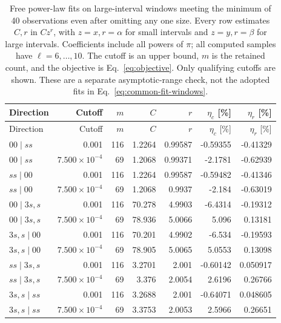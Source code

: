 \begin{longtable}{lrrrrrr}
\caption{Free power-law fits on large-interval windows meeting the minimum of 40 observations even after omitting any one size. Every row estimates $C,r$ in $Cz^r$, with $z=x,r=\alpha$ for small intervals and $z=y,r=\beta$ for large intervals. Coefficients include all powers of $\pi$; all computed samples have $\ell=6,\ldots,10$. The cutoff is an upper bound, $m$ is the retained count, and the objective is Eq.~\eqref{eq:objective}. Only qualifying cutoffs are shown. These are a separate asymptotic-range check, not the adopted fits in Eq.~\eqref{eq:common-fit-windows}.}
\label{tab:boson-large-windows}\\\toprule
Direction & Cutoff & $m$ & $C$ & $r$ & $\eta_c$ [\%] & $\eta_r$ [\%]\\\midrule
\endfirsthead
\toprule
Direction & Cutoff & $m$ & $C$ & $r$ & $\eta_c$ [\%] & $\eta_r$ [\%]\\\midrule
\endhead
\bottomrule\endfoot
$00\mid ss$ & 0.001 & 116 & 1.2264 & 0.99587 & -0.59355 & -0.41329\\
$00\mid ss$ & $7.500\!\times\!10^{-4}$ & 69 & 1.2068 & 0.99371 & -2.1781 & -0.62939\\
$ss\mid 00$ & 0.001 & 116 & 1.2264 & 0.99587 & -0.59482 & -0.41346\\
$ss\mid 00$ & $7.500\!\times\!10^{-4}$ & 69 & 1.2068 & 0.9937 & -2.184 & -0.63019\\
$00\mid 3s,s$ & 0.001 & 116 & 70.278 & 4.9903 & -6.4314 & -0.19312\\
$00\mid 3s,s$ & $7.500\!\times\!10^{-4}$ & 69 & 78.936 & 5.0066 & 5.096 & 0.13181\\
$3s,s\mid 00$ & 0.001 & 116 & 70.201 & 4.9902 & -6.534 & -0.19593\\
$3s,s\mid 00$ & $7.500\!\times\!10^{-4}$ & 69 & 78.905 & 5.0065 & 5.0553 & 0.13098\\
$ss\mid 3s,s$ & 0.001 & 116 & 3.2701 & 2.001 & -0.60142 & 0.050917\\
$ss\mid 3s,s$ & $7.500\!\times\!10^{-4}$ & 69 & 3.376 & 2.0054 & 2.6196 & 0.26766\\
$3s,s\mid ss$ & 0.001 & 116 & 3.2688 & 2.001 & -0.64071 & 0.048605\\
$3s,s\mid ss$ & $7.500\!\times\!10^{-4}$ & 69 & 3.3753 & 2.0053 & 2.5966 & 0.26651\\
\end{longtable}
